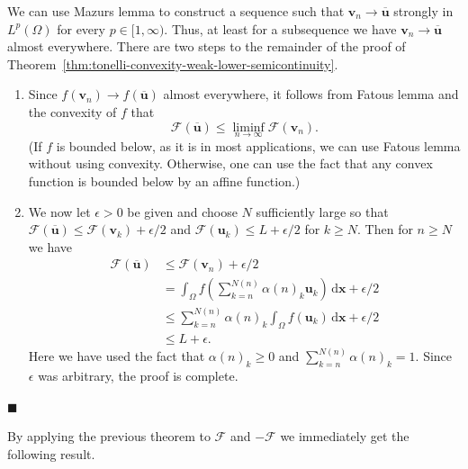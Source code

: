 \begingroup
\renewenvironment{Proof}{\par}{\par\nobreak\hfill$\blacksquare$\par\vspace{0.1cm}}
\begin{Proof}
We can use Mazur\textquotesingle s lemma to construct a sequence such that $\bm{v}_n\to\overline{\bm{u}}$ strongly in $L^p(\Omega)$ for every $p\in[1,\infty)$. Thus, at least for a subsequence we have $\bm{v}_n\to\overline{\bm{u}}$ almost everywhere. There are two steps to the remainder of the proof of Theorem~\ref{thm:tonelli-convexity-weak-lower-semicontinuity}.\begin{enumerate}\item Since $f(\bm{v}_n)\to f(\overline{\bm{u}})$ almost everywhere, it follows from Fatou\textquotesingle s lemma and the convexity of $f$ that
\begin{equation}\label{eq:tonelli-sufficiency-fatou-lower-bound}
\mathcal{F}(\overline{\bm{u}})\leq\liminf_{n\to\infty}\mathcal{F}(\bm{v}_n).
\end{equation}
(If $f$ is bounded below, as it is in most applications, we can use Fatou\textquotesingle s lemma without using convexity. Otherwise, one can use the fact that any convex function is bounded below by an affine function.)\item We now let $\epsilon>0$ be given and choose $N$ sufficiently large so that $\mathcal{F}(\overline{\bm{u}})\leq\mathcal{F}(\bm{v}_k)+\epsilon/2$ and $\mathcal{F}(\bm{u}_k)\leq L+\epsilon/2$ for $k\geq N$. Then for $n\geq N$ we have\[
\begin{aligned}
 \mathcal{F}(\overline{\bm{u}})&\leq\mathcal{F}(\bm{v}_n)+\epsilon/2\\
 &=\int_\Omega f\left(\sum_{k=n}^{N(n)}\alpha(n)_k\bm{u}_k\right)\,\mathrm{d}\bm{x}+\epsilon/2\\
 &\leq\sum_{k=n}^{N(n)}\alpha(n)_k\int_\Omega f(\bm{u}_k)\,\mathrm{d}\bm{x}+\epsilon/2\\
 &\leq L+\epsilon.
\end{aligned}
\]Here we have used the fact that $\alpha(n)_k\geq0$ and $\sum_{k=n}^{N(n)}\alpha(n)_k=1$. Since $\epsilon$ was arbitrary, the proof is complete.\end{enumerate}
\end{Proof}
\endgroup

By applying the previous theorem to $\mathcal{F}$ and $-\mathcal{F}$ we immediately get the following result.

